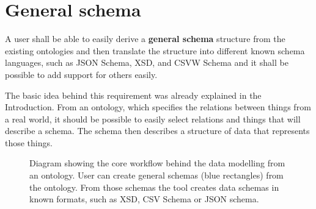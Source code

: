 \section{General schema}

\begin{requirement}
A user shall be able to easily derive a \textbf{general schema} structure from the existing ontologies and then translate the structure into different known schema languages, such as JSON Schema, XSD, and CSVW Schema and it shall be possible to add support for others easily.
\label{requirement:general-schema}
\end{requirement}

The basic idea behind this requirement was already explained in the Introduction. From an ontology, which specifies the relations between things from a real world, it should be possible to easily select relations and things that will describe a schema. The schema then describes a structure of data that represents those things.

\begin{figure}[h!]\centering
  \caption{Diagram showing the core workflow behind the data modelling from an ontology. User can create general schemas (blue rectangles) from the ontology. From those schemas the tool creates data schemas in known formats, such as XSD, CSV Schema or JSON schema.}
\end{figure}

